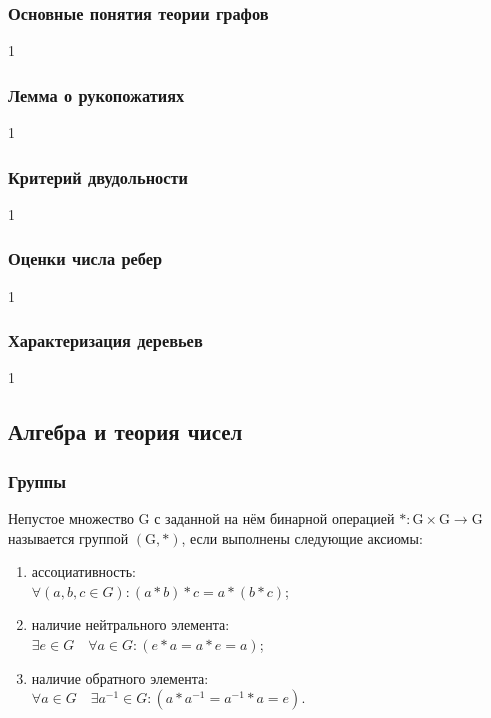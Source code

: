 \documentclass[12pt]{matmex-diploma}
\begin{document}
        \subsubsection*{Основные понятия теории графов}
            1
        \subsubsection*{Лемма о рукопожатиях}
            1
        \subsubsection*{Критерий двудольности}
            1
        \subsubsection*{Оценки числа ребер}
            1
        \subsubsection*{Характеризация деревьев}      
            1
        
    \subsection{Алгебра и теория чисел}
        
        \subsubsection*{Группы}
            Непустое множество G с заданной на нём бинарной операцией $*:\mathrm{G} \times \mathrm{G} \rightarrow \mathrm{G}$ называется группой $(\mathrm {G} ,*)$, если выполнены следующие аксиомы:
            \begin{enumerate}
                \item ассоциативность: \\$\forall (a,b,c\in G)\colon (a*b)*c=a*(b*c)$;
                \item наличие нейтрального элемента: \\$\exists e\in G\quad \forall a\in G\colon (e*a=a*e=a)$;
                \item наличие обратного элемента: \\$\forall a\in G\quad \exists a^{-1}\in G\colon (a*a^{-1}=a^{-1}*a=e)$.
            \end{enumerate}
            
\end{document}
